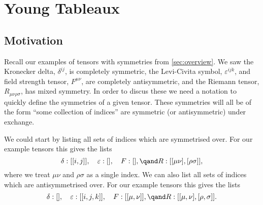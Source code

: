 \documentclass[fleqn]{NotesClass}
\begin{document}
    \chapter{Young Tableaux}
    \section{Motivation}
    Recall our examples of tensors with symmetries from \cref{sec:overview}.
    We saw the Kronecker delta, \(\delta^{ij}\), is completely symmetric, the Levi-Civita symbol, \(\varepsilon^{ijk}\), and field strength tensor, \(F^{\mu\nu}\), are completely antisymmetric, and the Riemann tensor, \(R_{\mu\nu\rho\sigma}\), has mixed symmetry.
    In order to discus these we need a notation to quickly define the symmetries of a given tensor.
    These symmetries will all be of the form \enquote{some collection of indices} are symmetric (or antisymmetric) under exchange.
    
    We could start by listing all sets of indices which are symmetrised over.
    For our example tensors this gives the lists
    \begin{equation}
        \delta: [[i, j]], \quad \varepsilon: [], \quad F: [], \qand R: [[\mu\nu], [\rho\sigma]],
    \end{equation}
    where we treat \(\mu\nu\) and \(\rho\sigma\) as a single index.
    We can also list all sets of indices which are antisymmetrised over.
    For our example tensors this gives the lists
    \begin{equation}
        \delta: [], \quad \varepsilon: [[i, j, k]], \quad F: [[\mu, \nu]], \qand R: [[\mu, \nu], [\rho, \sigma]].
    \end{equation}
    
\end{document}
